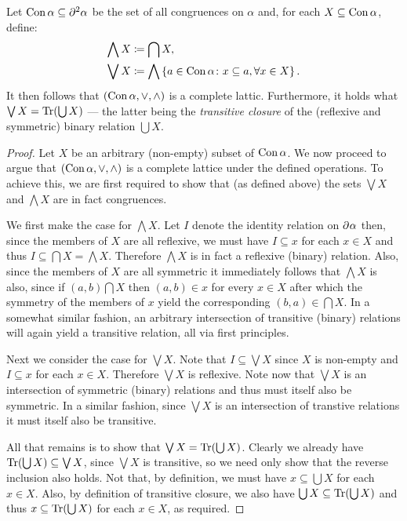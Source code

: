 \begin{prp}
        Let $\operatorname{Con} \alpha\subseteq\partial^{2}\alpha$ be the set of all congruences on $\alpha$ and, for each $X\subseteq \operatorname{Con}\alpha$, define:
        \begin{align}
            \bigwedge X &\coloneqq\bigcap X,\\
            \bigvee X   &\coloneqq\bigwedge\left\lbrace a\in\operatorname{Con}\alpha\colon x\subseteq a,\forall x\in X \right\rbrace.
        \end{align}
        It then follows that $(\operatorname{Con}\alpha,\vee,\wedge)$ is a complete lattic.  Furthermore, it holds what $\bigvee X=\operatorname{Tr}(\bigcup X)$ --- the latter being the \textit{transitive closure} of the (reflexive and symmetric) binary relation $\bigcup X$.
\end{prp}
\begin{proof}
	Let $X$ be an arbitrary (non-empty) subset of $\operatorname{Con}\alpha$.  We now proceed to argue that $(\operatorname{Con}\alpha,\vee,\wedge)$ is a complete lattice under the defined operations.  To achieve this, we are first required to show that (as defined above) the sets $\bigvee X$ and $\bigwedge X$ are in fact congruences.

	We first make the case for $\bigwedge X$.  Let $I$ denote the identity relation on $\partial^{}\alpha$ then, since the members of $X$ are all reflexive, we must have $I\subseteq x$ for each $x\in X$ and thus $I\subseteq\bigcap X=\bigwedge X$.  Therefore $\bigwedge X$ is in fact a reflexive (binary) relation.  Also, since the members of $X$ are all symmetric it immediately follows that $\bigwedge X$ is also, since if $(a,b)\bigcap X$ then $(a,b)\in x$ for every $x\in X$ after which the symmetry of the members of $x$ yield the corresponding $(b,a)\in\bigcap X$.  In a somewhat similar fashion, an arbitrary intersection of transitive (binary) relations will again yield a transitive relation, all via first principles.

	Next we consider the case for $\bigvee X$.  Note that $I\subseteq \bigvee X$ since $X$ is non-empty and $I\subseteq x$ for each $x\in X$.  Therefore $\bigvee X$ is reflexive.  Note now that $\bigvee X$ is an intersection of symmetric (binary) relations and thus must itself also be symmetric.  In a similar fashion, since $\bigvee X$ is an intersection of transtive relations it must itself also be transitive.

	All that remains is to show that $\bigvee X=\operatorname{Tr}(\bigcup X)$.  Clearly we already have $\operatorname{Tr}(\bigcup X)\subseteq\bigvee X$, since $\bigvee X$ is transitive,  so we need only show that the reverse inclusion also holds.  Not that, by definition, we must have $x\subseteq\bigcup X$ for each $x\in X$.  Also, by definition of transitive closure, we also have $\bigcup X\subseteq \operatorname{Tr}(\bigcup X)$ and thus $x\subseteq\operatorname{Tr}(\bigcup X)$ for each $x\in X$, as required.
\end{proof}

